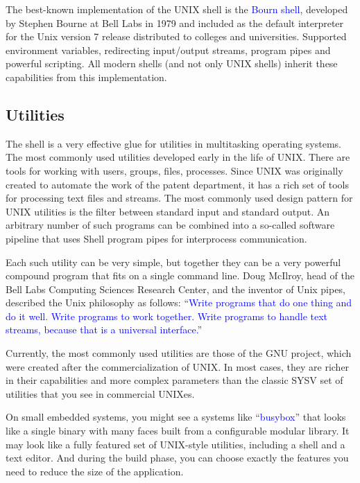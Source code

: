 \documentclass[12pt]{report}
\newcommand{\struct}[1]{\textcolor{blue}{#1}}
\begin{document}
\medskip
The best-known implementation of the UNIX shell is the \struct{Bourn shell},
developed by Stephen Bourne at Bell Labs in 1979 and included as the
default interpreter for the Unix version 7 release distributed to
colleges and universities. Supported environment variables, redirecting
input/output streams, program pipes and powerful scripting. All modern
shells (and not only UNIX shells) inherit these capabilities from this
implementation.

\subsection*{Utilities}

The shell is a very effective glue for utilities in multitasking
operating systems. The most commonly used utilities developed early in
the life of UNIX. There are tools for working with users, groups, files,
processes. Since UNIX was originally created to automate the work of the
patent department, it has a rich set of tools for processing text files
and streams. The most commonly used design pattern for UNIX utilities is
the filter between standard input and standard output. An arbitrary
number of such programs can be combined into a so-called software
pipeline that uses Shell program pipes for interprocess communication.

\medskip
Each such utility can be very simple, but together they can be a very
powerful compound program that fits on a single command line. Doug
McIlroy, head of the Bell Labs Computing Sciences Research Center, and
the inventor of Unix pipes, described the Unix philosophy as follows:
``\struct{Write programs that do one thing and do it well. Write programs
to work together. Write programs to handle text streams, because that is
a universal interface.}''

\medskip
Currently, the most commonly used utilities are those of the GNU project,
which were created after the commercialization of UNIX. In most cases,
they are richer in their capabilities and more complex parameters than
the classic SYSV set of utilities that you see in commercial UNIXes.

\medskip
On small embedded systems, you might see a systems like ``\struct{busybox}''
that looks like a single binary with many faces built from a configurable
modular library. It may look like a fully featured set of UNIX-style
utilities, including a shell and a text editor. And during the build
phase, you can choose exactly the features you need to reduce the size of
the application.
\end{document}
